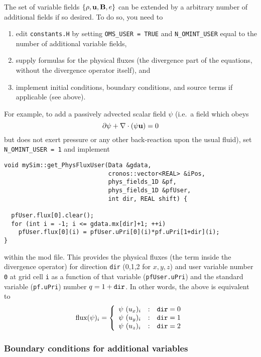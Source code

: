 The set of variable fields \mbox{$\{\rho,{\bf u}, {\bf B}, e\}$} can be
extended by a arbitrary number of additional fields if so desired.
To do so, you need to
\begin{enumerate}
\item edit {\tt constants.H} by setting \mbox{\tt OMS\_USER = TRUE}
  and {\tt N\_OMINT\_USER} equal to the number of additional
  variable fields,
\item supply formulas for the physical fluxes (the divergence part of
  the equations, without the divergence operator itself), and
\item implement initial conditions, boundary conditions, and source
  terms if applicable (see above).
\end{enumerate}
For example, to add a passively advected scalar field $\psi$ (i.e.\ a
field which obeys
\[ \partial \psi + \nabla \cdot (\psi {\bf u})=0 \]
but does not exert pressure or any other back-reaction upon the usual
fluid), set \mbox{\tt N\_OMINT\_USER = 1} and implement
\begin{verbatim}
void mySim::get_PhysFluxUser(Data &gdata,
                             cronos::vector<REAL> &iPos,
                             phys_fields_1D &pf,
                             phys_fields_1D &pfUser,
                             int dir, REAL shift) {
	
  pfUser.flux[0].clear();
  for (int i = -1; i <= gdata.mx[dir]+1; ++i)
    pfUser.flux[0](i) = pfUser.uPri[0](i)*pf.uPri[1+dir](i);
}
\end{verbatim}
within the mod file.
This provides the physical fluxes (the term inside the divergence
operator) for direction {\tt dir} (0,1,2 for $x,y,z$) and user
variable number {\tt 0} at grid cell {\tt i} as a function of that
variable ({\tt pfUser.uPri}) and the standard variable ({\tt pf.uPri})
number $q=1+{\tt dir}$. In other words, the above is equivalent to
\begin{equation}
  \mbox{flux}(\psi)_i = \left\{ \begin{array}{ccc}
    \psi \ (u_x)_i &:& {\tt dir} = 0 \\
    \psi \ (u_y)_i &:& {\tt dir} = 1 \\
    \psi \ (u_z)_i &:& {\tt dir} = 2 \\
  \end{array} \right.
\end{equation}

\subsubsection{Boundary conditions for additional variables}

